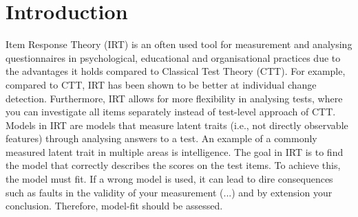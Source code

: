 \documentclass[Royal,sageapa,times,doublespace]{sagej}
\begin{document}
\section{Introduction}
Item Response Theory (IRT) is an often used tool for measurement and analysing questionnaires in psychological, educational and organisational practices due to the advantages it holds compared to Classical Test Theory (CTT). For example, compared to CTT, IRT has been shown to be better at individual change detection. Furthermore, IRT allows for more flexibility in analysing tests, where you can investigate all items separately instead of test-level approach of CTT. Models in IRT are models that measure latent traits (i.e., not directly observable features) through analysing answers to a test. An example of a commonly measured latent trait in multiple areas is intelligence. The goal in IRT is to find the model that correctly describes the scores on the test items. To achieve this, the model must fit. If a wrong model is used, it can lead to dire consequences such as faults in the validity of your measurement (...) and by extension your conclusion. Therefore, model-fit should be assessed. \\
\end{document}
